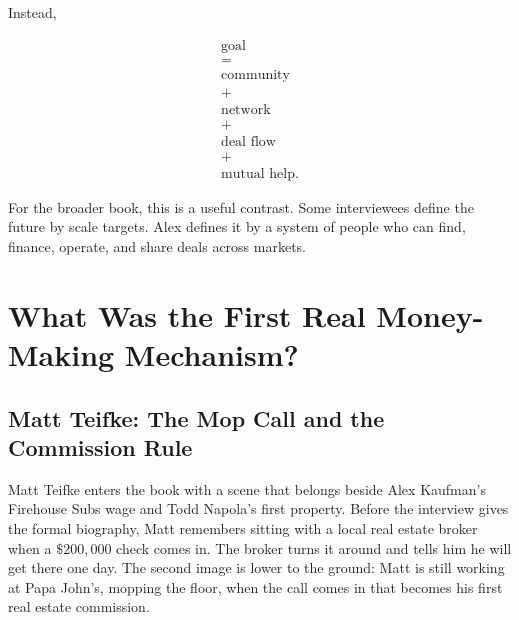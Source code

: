 \documentclass[11pt,oneside]{book}
\begin{document}
Instead,

\begin{equation}
\begin{gathered}
\text{goal}\\
=\\
\text{community}\\
+\\
\text{network}\\
+\\
\text{deal flow}\\
+\\
\text{mutual help}.
\end{gathered}
\end{equation}

For the broader book, this is a useful contrast. Some interviewees define the future by scale targets. Alex defines it by a system of people who can find, finance, operate, and share deals across markets.


\chapter{What Was the First Real Money-Making Mechanism?}

\section{Matt Teifke: The Mop Call and the Commission Rule}

Matt Teifke enters the book with a scene that belongs beside Alex Kaufman's Firehouse Subs wage and Todd Napola's first property. Before the interview gives the formal biography, Matt remembers sitting with a local real estate broker when a \(\$200{,}000\) check comes in. The broker turns it around and tells him he will get there one day. The second image is lower to the ground: Matt is still working at Papa John's, mopping the floor, when the call comes in that becomes his first real estate commission.
\end{document}
